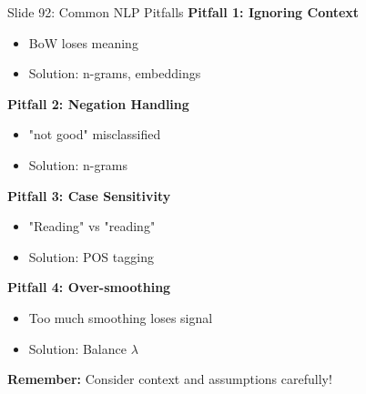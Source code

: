 \documentclass[8pt]{beamer}
\begin{document}
	\begin{frame}{Slide 92: Common NLP Pitfalls}
		\fontsize{6.5}{7.5}\selectfont
		\textbf{Pitfall 1: Ignoring Context}
		\begin{itemize}
			\item BoW loses meaning
			\item Solution: n-grams, embeddings
		\end{itemize}
		
		\vspace{0.1cm}
		\textbf{Pitfall 2: Negation Handling}
		\begin{itemize}
			\item "not good" misclassified
			\item Solution: n-grams
		\end{itemize}
		
		\vspace{0.1cm}
		\textbf{Pitfall 3: Case Sensitivity}
		\begin{itemize}
			\item "Reading" vs "reading"
			\item Solution: POS tagging
		\end{itemize}
		
		\vspace{0.1cm}
		\textbf{Pitfall 4: Over-smoothing}
		\begin{itemize}
			\item Too much smoothing loses signal
			\item Solution: Balance $\lambda$
		\end{itemize}
		
		\textcolor{myblue}{\textbf{Remember:}} Consider context and assumptions carefully!
	\end{frame}
	
\end{document}
